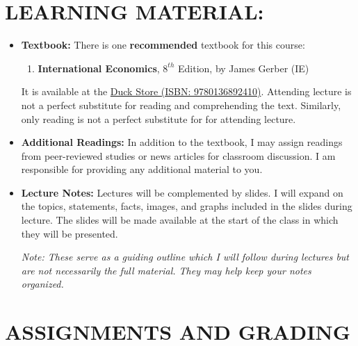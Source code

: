 \documentclass[11pt]{article}
\begin{document}
\section*{LEARNING MATERIAL:}
\begin{itemize}
    \item \textbf{Textbook:} There is one \textbf{recommended} textbook for this course:
        \begin{enumerate}
            \item \textbf{International Economics}, $8^{th}$ Edition, by James Gerber (IE)
        \end{enumerate}
    It is available at the \href{https://www.uoduckstore.com/book-search-results?crn=21976&term=202402}{Duck Store (ISBN: 9780136892410)}.
    Attending lecture is not a perfect substitute for reading and comprehending the text. 
    Similarly, only reading is not a perfect substitute for for attending lecture. 
    \item \textbf{Additional Readings:} In addition to the textbook, I may assign readings from peer-reviewed studies or news articles for classroom discussion. 
    I am responsible for providing any additional material to you.
    \item \textbf{Lecture Notes:} Lectures will be complemented by slides.
    I will expand on the topics, statements, facts, images, and graphs included in the slides during lecture. 
    The slides will be made available at the start of the class in which they will be presented. 
    
    \emph{Note: These serve as a guiding outline which I will follow during lectures but are not necessarily the full material. They may help keep your notes organized.}
\end{itemize}

\bigskip 

\section*{ASSIGNMENTS AND GRADING}



\bigskip 
\end{document}
